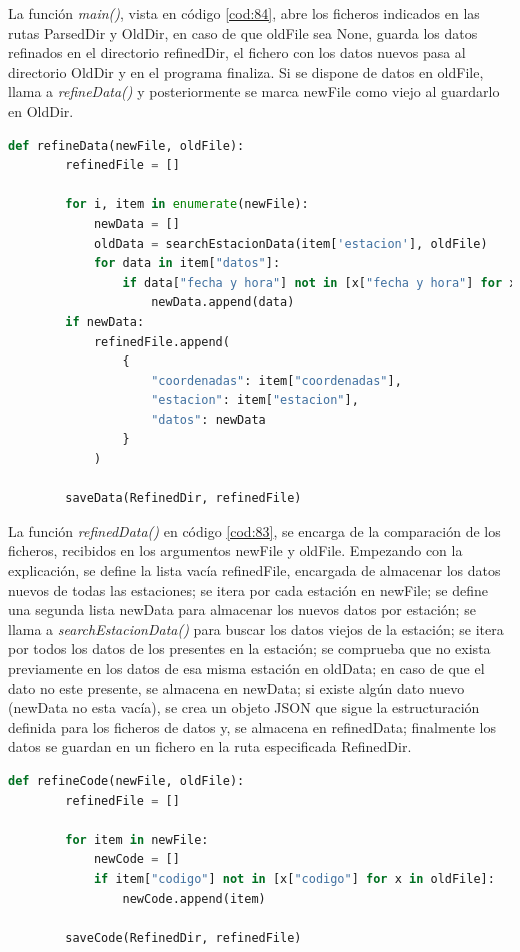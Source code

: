 La función \textit{main()}, vista en código \ref{cod:84}, abre los ficheros indicados en las rutas ParsedDir y OldDir, en caso de que oldFile sea None, guarda los datos refinados en el directorio refinedDir, el fichero con los datos nuevos pasa al directorio OldDir y en el programa finaliza. Si se dispone de datos en oldFile, llama a \textit{refineData()} y posteriormente se marca newFile como viejo al guardarlo en OldDir.

\begin{lstlisting}[language=Python, caption={Declaración función refinedData()}, label=cod:83]
	def refineData(newFile, oldFile):
		refinedFile = []
		
		for i, item in enumerate(newFile):
			newData = []
			oldData = searchEstacionData(item['estacion'], oldFile)
			for data in item["datos"]:
				if data["fecha y hora"] not in [x["fecha y hora"] for x in oldData]:
					newData.append(data)
		if newData:
			refinedFile.append(
				{
					"coordenadas": item["coordenadas"],
					"estacion": item["estacion"],
					"datos": newData
				}
			)
		
		saveData(RefinedDir, refinedFile)
\end{lstlisting}

La función \textit{refinedData()} en código \ref{cod:83}, se encarga de la comparación de los ficheros, recibidos en los argumentos newFile y oldFile. Empezando con la explicación, se define la lista vacía refinedFile, encargada de almacenar los datos nuevos de todas las estaciones; se itera por cada estación en newFile; se define una segunda lista newData para almacenar los nuevos datos por estación; se llama a \textit{searchEstacionData()} para buscar los datos viejos de la estación; se itera por todos los datos de los presentes en la estación; se comprueba que no exista previamente en los datos de esa misma estación en oldData; en caso de que el dato no este presente, se almacena en newData; si existe algún dato nuevo (newData no esta vacía), se crea un objeto JSON que sigue la estructuración definida para los ficheros de datos y, se almacena en refinedData; finalmente los datos se guardan en un fichero en la ruta especificada RefinedDir.

\begin{lstlisting}[language=Python, caption={Declaración función refinedCode()}, label=cod:114]
	def refineCode(newFile, oldFile):
		refinedFile = []
		
		for item in newFile:
			newCode = []
			if item["codigo"] not in [x["codigo"] for x in oldFile]:
				newCode.append(item)
		
		saveCode(RefinedDir, refinedFile)
\end{lstlisting}

